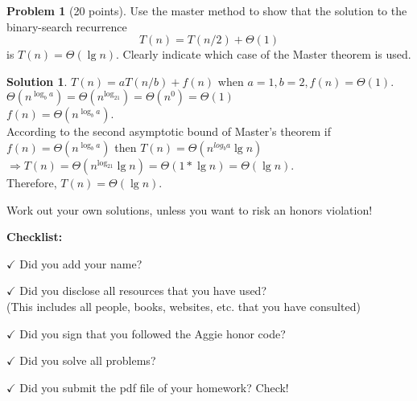 \documentclass{article}
\theoremstyle{definition}
\newtheorem{problem}{Problem}
\newtheorem*{solution}{Solution}
\newcommand{\checklist}{\noindent\textbf{Checklist:}
\begin{compactitem}[$\Box$] 
\item [$\checkmark$] Did you add your name? 
\item [$\checkmark$] Did you disclose all resources that you have used? \\
(This includes all people, books, websites, etc. that you have consulted)
\item [$\checkmark$] Did you sign that you followed the Aggie honor code? 
\item [$\checkmark$] Did you solve all problems? 
\item [$\checkmark$] Did you submit the pdf file of your homework? Check!
\end{compactitem}
}
\begin{document}
\begin{problem}[20 points]
Use the master method to show that the solution to the binary-search 
recurrence 
$$ T(n) = T(n/2)+\Theta(1)$$
is $T(n) = \Theta(\lg n)$. Clearly indicate which case of the Master
theorem is used.  
\end{problem}
\begin{solution}
$T(n) = aT(n/b) + f(n)$ when $a = 1, b = 2, f(n) = \Theta(1)$. \\
$\Theta(n^{\log_ba}) = \Theta(n^{\log_21}) = \Theta(n^0) = \Theta(1)$\\
$f(n) = \Theta(n^{\log_ba})$. \\
According to the second asymptotic bound of Master's theorem if $f(n) = \Theta(n^{\log_ba})$ then $T(n) = \Theta(n^{log_ba}\lg{n})$\\
$\Rightarrow T(n) = \Theta(n^{\log_21}\lg{n}) = \Theta(1*\lg{n}) = \Theta(\lg{n})$. \\
Therefore, $T(n) = \Theta(\lg n)$.
\end{solution}

Work out your own solutions, unless you want to risk an honors
violation!
\medskip



\goodbreak
\checklist
\end{document}
